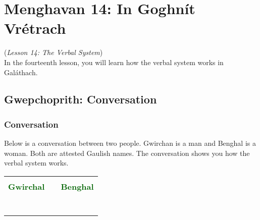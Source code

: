 \section{Menghavan 14: In Goghn\'{i}t Vr\'{e}trach}
(\textit{Lesson 14: The Verbal System})\\

In the fourteenth lesson, you will learn how the verbal system works in Gal\'{a}thach.

\subsection{Gwepchoprith: Conversation}
\subsubsection{Conversation}

Below is a conversation between two people. Gwirchan is a man and Benghal is a woman. Both are attested Gaulish names. The conversation shows you how the verbal system works.

\begin{table}[H]
\centering
    \begin{tabular}{M{3.0cm}M{10.0cm}M{3.0cm}}
     &  & \\
    \textcolor{darkgreen}{\textbf{Gwirchal}} &  & \textcolor{darkgreen}{\textbf{Benghal}}\\
     &  & \\
     &  & \\
     &  & \\
     &  & \\
     &  & \\
     &  & \\
     &  & 
    \end{tabular}
\end{table}


